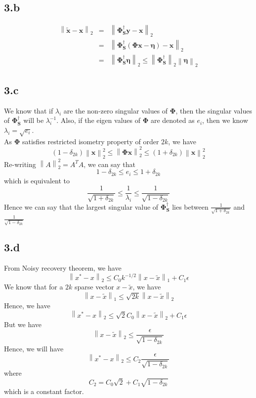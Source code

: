 \documentclass[12pt]{article}
\newcommand{\norm}[1]{\left\lVert #1 \right\rVert}
\begin{document}
\subsection*{3.b}
\begin{eqnarray*}
\norm{\boldsymbol{\tilde{x}} - \boldsymbol{x}}_2 &=& \norm{\boldsymbol{\Phi_S^\dagger y - x}}_2\\
&=&\norm{\boldsymbol{\Phi_S^\dagger}(\boldsymbol{\Phi x - \eta}) - \boldsymbol{x}}_2\\
&=& \norm{\boldsymbol{\Phi_S^\dagger \eta}}_2 \leq \norm{\boldsymbol{\Phi_S^\dagger}}_2 \norm{\boldsymbol{\eta}}_2
\end{eqnarray*}
\subsection*{3.c}
We know that if $\lambda_i$ are the non-zero singular values of $\boldsymbol{\Phi}$, then the singular values of $\boldsymbol{\Phi_S^\dagger}$ will be $\lambda_i^{-1}$. Also, if the eigen values of $\boldsymbol{\Phi}$ are denoted as $e_i$, then we know $\lambda_i = \sqrt{e_i}$.\\
As $\boldsymbol{\Phi}$ satisfies restricted isometry property of order $2k$, we have
$$(1 - \delta_{2k}) \norm{\boldsymbol{x}}_2^2 \leq \norm{\boldsymbol{\Phi x}}_2^2 \leq (1 + \delta_{2k}) \norm{\boldsymbol{x}}_2^2$$
Re-writing $\norm{A}_2^2 = A^T A$, we can say that 
$$1 - \delta_{2k} \leq e_i \leq 1 + \delta_{2k}$$
which is equivalent to
$$\frac{1}{\sqrt{1 + \delta_{2k}}} \leq \frac{1}{\lambda_i} \leq \frac{1}{\sqrt{1 - \delta_{2k}}}$$
Hence we can say that the largest singular value of $\boldsymbol{\Phi_S^\dagger}$ lies between $\frac{1}{\sqrt{1 + \delta_{2k}}}$ and $\frac{1}{\sqrt{1 - \delta_{2k}}}$
\subsection*{3.d}
From Noisy recovery theorem, we have
$$\norm{x^* - x}_2 \leq C_0 k^{-1/2} \norm{x - \tilde{x}}_1 + C_1 \epsilon$$
We know that for a $2k$ sparse vector $x - \tilde{x}$, we have
$$\norm{x - \tilde{x}}_1 \leq \sqrt{2k} \norm{x - \tilde{x}}_2$$
Hence, we have
$$\norm{x^* - x}_2 \leq \sqrt{2} C_0 \norm{x - \tilde{x}}_2 + C_1 \epsilon$$
But we have
$$\norm{x - \tilde{x}}_2 \leq \frac{\epsilon}{\sqrt{1 - \delta_{2k}}}$$
Hence, we will have
$$\norm{x^* - x}_2 \leq C_2 \frac{\epsilon}{\sqrt{1 - \delta_{2k}}}$$
where 
$$C_2 = C_0 \sqrt{2}+ C_1 \sqrt{1 - \delta_{2k}}$$
which is a constant factor.
\end{document}
